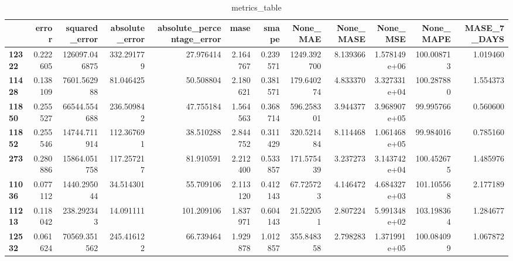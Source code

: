 \begin{table}[h]
\centering
\caption{metrics_table}
\label{table:Experiment with CNN AE and LSTM hybrid method. Local, univariate, dataset seasonal. Tuned with LSTM Local Univariate dataset seasonal}
\begin{tabular}{lrrrrrrrrrrr}
\toprule
{} &     error &  squared\_error &  absolute\_error &  absolute\_percentage\_error &      mase &     smape &     None\_MAE &  None\_MASE &      None\_MSE &   None\_MAPE &  MASE\_7\_DAYS \\
\midrule
\textbf{12322} &  0.222605 &  126097.046875 &      332.291779 &                  27.976414 &  2.164767 &  0.239571 &  1249.392700 &   8.139366 &  1.578149e+06 &  100.008713 &     1.019460 \\
\textbf{11428} &  0.138109 &    7601.562988 &       81.046425 &                  50.508804 &  2.180621 &  0.381571 &   179.640274 &   4.833370 &  3.327331e+04 &  100.287880 &     1.554373 \\
\textbf{11850} &  0.255527 &   66544.554688 &      236.509842 &                  47.755184 &  1.564563 &  0.368714 &   596.258301 &   3.944377 &  3.968907e+05 &   99.995766 &     0.560600 \\
\textbf{11852} &  0.255546 &   14744.711914 &      112.367691 &                  38.510288 &  2.844752 &  0.311429 &   320.521484 &   8.114468 &  1.061468e+05 &   99.984016 &     0.785160 \\
\textbf{273  } &  0.280886 &   15864.051758 &      117.257217 &                  81.910591 &  2.212400 &  0.533857 &   171.575439 &   3.237273 &  3.143742e+04 &  100.452675 &     1.485976 \\
\textbf{11036} &  0.077112 &    1440.295044 &       34.514301 &                  55.709106 &  2.113120 &  0.412143 &    67.725723 &   4.146472 &  4.684327e+03 &  101.105568 &     2.177189 \\
\textbf{11213} &  0.118042 &     238.292343 &       14.091111 &                 101.209106 &  1.837971 &  0.604143 &    21.522051 &   2.807224 &  5.991348e+02 &  103.198364 &     1.284677 \\
\textbf{12532} &  0.061624 &   70569.351562 &      245.416122 &                  66.739464 &  1.929878 &  1.012857 &   355.848358 &   2.798283 &  1.371991e+05 &  100.084099 &     1.067872 \\
\bottomrule
\end{tabular}
\end{table}

